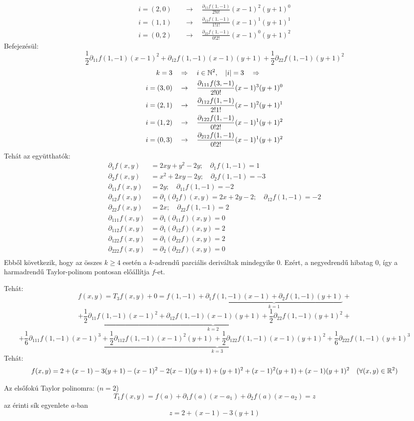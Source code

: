 \documentclass[a4paper,11.5pt]{article}
\begin{document}
\begin{example}
\begin{align*}
			i=(2,0)&\quad \to\quad \frac{\partial_{11}f(1,-1)}{2!0!}(x-1)^2(y+1)^0\\
			i=(1,1)&\quad \to\quad \frac{\partial_{12}f(1,-1)}{1!1!}(x-1)^1(y+1)^1\\
			i=(0,2)&\quad \to\quad \frac{\partial_{22}f(1,-1)}{0!2!}(x-1)^0(y+1)^2
		\end{align*}
		Befejezésül:
		\[ \frac{1}{2}\partial_{11}f(1,-1)(x-1)^2+\partial_{12}f(1,-1)(x-1)(y+1)+\frac{1}{2}\partial_{22}f(1,-1)(y+1)^2 \]
		\begin{align*}
			k=3&\quad \Rightarrow\quad i\in\mathbb{N}^2,\quad |i|=3\quad \Rightarrow\quad\\
			i=(3,0)&\quad \to\quad \frac{\partial_{111}f(3,-1)}{2!0!}(x-1)^3(y+1)^0\\
			i=(2,1)&\quad \to\quad \frac{\partial_{112}f(1,-1)}{2!1!}(x-1)^2(y+1)^1\\
			i=(1,2)&\quad \to\quad \frac{\partial_{122}f(1,-1)}{0!2!}(x-1)^1(y+1)^2\\
			i=(0,3)&\quad \to\quad \frac{\partial_{212}f(1,-1)}{0!2!}(x-1)^1(y+1)^2
		\end{align*}
		Tehát az együtthatók:
		\begin{align*}
			\partial_1f(x,y)&=2xy+y^2-2y;\quad \partial_1f(1,-1)=1\\
			\partial_2f(x,y)&=x^2+2xy-2y;\quad \partial_2f(1,-1)=-3\\
			\partial_{11}f(x,y)&=2y;\quad \partial_{11}f(1,-1)=-2\\
			\partial_{12}f(x,y)&=\partial_1(\partial_2f)(x,y)=2x+2y-2;\quad \partial_{12}f(1,-1)=-2\\
			\partial_{22}f(x,y)&=2x;\quad \partial_{22}f(1,-1)=2\\
			\partial_{111}f(x,y)&=\partial_1(\partial_{11}f)(x,y)=0\\
			\partial_{112}f(x,y)&=\partial_1(\partial_{12}f)(x,y)=2\\
			\partial_{122}f(x,y)&=\partial_1(\partial_{22}f)(x,y)=2\\
			\partial_{222}f(x,y)&=\partial_2(\partial_{22}f)(x,y)=0\\
		\end{align*}
		Ebből következik, hogy az összes $k\geq4$ esetén a $k$-adrendű parciális deriváltak mindegyike 0. Ezért, a negyedrendű hibatag 0, így a harmadrendű Taylor-polinom pontosan előállítja $f$-et.
		
		Tehát:
		\[ f(x,y)=T_3f(x,y)+0=f(1,-1)+\underbrace{\partial_1f(1,-1)(x-1)+\partial_2f(1,-1)(y+1)}_{k=1}+\]
		\[+\underbrace{\frac{1}{2}\partial_{11}f(1,-1)(x-1)^2+\partial_{12}f(1,-1)(x-1)(y+1)+\frac{1}{2}\partial_{22}f(1,-1)(y+1)^2}_{k=2}+\]
		\[+\underbrace{\frac{1}{6}\partial_{111}f(1,-1)(x-1)^3+\frac{1}{2}\partial_{112}f(1,-1)(x-1)^2(y+1)+\frac{1}{2}\partial_{122}f(1,-1)(x-1)(y+1)^2+\frac{1}{6}\partial_{222}f(1,-1)(y+1)^3}_{k=3} \]
		Tehát:
		\[ f(x,y)=2+(x-1)-3(y+1)-(x-1)^2-2(x-1)(y+1)+(y+1)^2+(x-1)^2(y+1)+(x-1)(y+1)^2 \quad (\forall(x,y)\in\mathbb{R}^2)\]
	\end{example}
	\begin{note}
		Az elsőfokú Taylor polinomra: ($n=2$)
		\[ T_1f(x,y)=f(a)+\partial_1f(a)(x-a_1)+\partial_2f(a)(x-a_2)=z \]
		az érinti sík egyenlete $a$-ban
		\[ z=2+(x-1)-3(y+1) \]
	\end{note}
\end{document}

